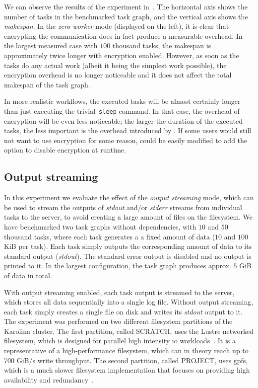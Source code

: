 We can observe the results of the experiment in~. The horizontal axis shows
the number of tasks in the benchmarked task graph, and the vertical axis shows the
\emph{makespan}. In the \emph{zero worker} mode (displayed on the left), it is clear
that encrypting the communication does in fact produce a measurable overhead. In the largest
measured case with $100$ thousand tasks, the makespan is approximately twice
longer with encryption enabled. However, as soon as the tasks do any actual work (albeit it being
the simplest work possible), the encryption overhead is no longer noticeable and it does not affect
the total makespan of the task graph.

In more realistic workflows, the executed tasks will be almost certainly longer than just executing
the trivial~\texttt{sleep} command. In that case, the overhead of encryption will be even
less noticeable; the larger the duration of the executed tasks, the less important is the overhead
introduced by \hyperqueue{}. If some users would still not want to use encryption for
some reason, \hyperqueue{} could be easily modified to add the option to disable
encryption at runtime.

\subsection{Output streaming}
\label{sec:hq-exp-output-streaming}
In this experiment we evaluate the effect of the \emph{output streaming} mode, which can be used to
stream the outputs of \emph{stdout} and/or \emph{stderr} streams from
individual tasks to the \hyperqueue{} server, to avoid creating a large amount of files
on the filesystem. We have benchmarked two task graphs without dependencies, with
$10$ and $50$ thousand tasks, where each task generates a a
fixed amount of data ($10$ and $100$ KiB per task). Each task
simply outputs the corresponding amount of data to its standard output (\emph{stdout}).
The standard error output is disabled and no output is printed to it. In the largest configuration,
the task graph produces approx. $5$ GiB of data in total.

With output streaming enabled, each task output is streamed to the server, which stores all data
sequentially into a single log file. Without output streaming, each task simply creates a single
file on disk and writes its \emph{stdout} output to it. The experiment was performed on
two different filesystem partitions of the Karolina cluster. The first partition, called SCRATCH,
uses the Lustre networked filesystem, which is designed for parallel high intensity
\gls{io} workloads~\cite{karolina_scratch}. It is a representative of a
high-performance filesystem, which can in theory reach up to 700 GiB/s write throughput. The second
partition, called PROJECT, uses \gls{gpfs}, which is a much slower filesystem
implementation that focuses on providing high availability and redundancy~\cite{karolina_project}.

